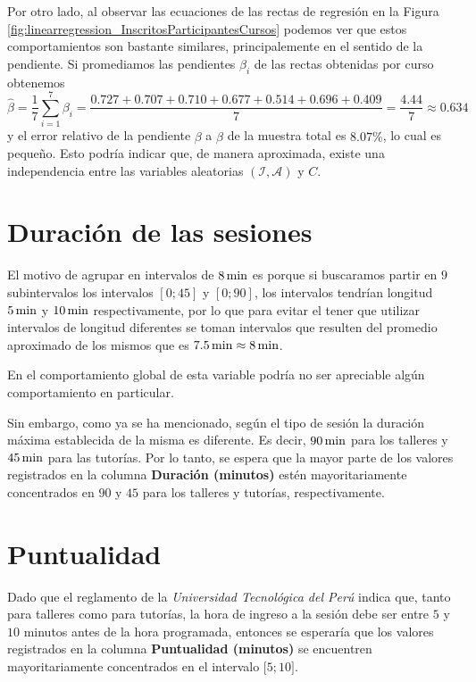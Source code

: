 \documentclass[11pt,a4paper]{book}
\theoremstyle{definition}%
\begin{document}
                Por otro lado, al observar las ecuaciones de las rectas de regresión en la Figura \ref{fig:linearregression_InscritosParticipantesCursos} podemos ver que estos comportamientos son bastante similares, principalemente en el sentido de la pendiente. Si promediamos las pendientes $\beta_i$ de las rectas obtenidas por curso obtenemos
                \begin{equation*}
                    \hat{\beta}=\frac{1}{7}\sum_{i=1}^{7}\beta_i=\frac{0.727+0.707+0.710+0.677+0.514+0.696+0.409}{7}=\frac{4.44}{7}\approx0.634
                \end{equation*}
                y el error relativo de la pendiente $\beta$ a $\hat{\beta}$ de la muestra total es $8.07\%$, lo cual es pequeño.
                Esto podría indicar que, de manera aproximada, existe una independencia entre las variables aleatorias $(\mathcal{I},\mathcal{A})$ y $C$.
        \section{Duración de las sesiones}
            El motivo de agrupar en intervalos de $8\,\textup{min}$ es porque si buscaramos partir en $9$ subintervalos los intervalos $[0;45]$ y $[0;90]$, los intervalos tendrían longitud $5\,\textup{min}$ y $10\,\textup{min}$ respectivamente, por lo que para evitar el tener que utilizar intervalos de longitud diferentes se toman intervalos que resulten del promedio aproximado de los mismos que es $7.5\,\textup{min}\approx8\,\textup{min}$.

            En el comportamiento global de esta variable podría no ser apreciable algún comportamiento en particular.

            Sin embargo, como ya se ha mencionado, según el tipo de sesión la duración máxima establecida de la misma es diferente. Es decir, $90\,\textup{min}$ para los talleres y $45\,\textup{min}$ para las tutorías. Por lo tanto, se espera que la mayor parte de los valores registrados en la columna \textbf{Duración (minutos)} estén mayoritariamente concentrados en $90$ y $45$ para los talleres y tutorías, respectivamente.
        
        \section{Puntualidad}
            Dado que el reglamento de la \textit{Universidad Tecnológica del Perú} indica que, tanto para talleres como para tutorías, la hora de ingreso a la sesión debe ser entre $5$ y $10$ minutos antes de la hora programada, entonces se esperaría que los valores registrados en la columna \textbf{Puntualidad (minutos)} se encuentren mayoritariamente concentrados en el intervalo $\mathopen[5;10\mathclose]$.
            
\end{document}
